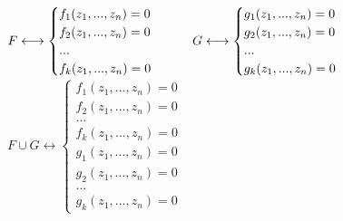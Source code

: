 \documentclass[geometry.tex]{subfiles}
\begin{document}
\begin{examples}
\begin{enumerate}
\begin{uutv}
\begin{enumerate}
              $F \longleftrightarrow \begin{cases}
              f_1(z_1,...,z_n) = 0\\
              f_2(z_1,...,z_n) = 0\\
              ...\\
              f_k(z_1,...,z_n) = 0
            \end{cases} \qquad
            G \longleftrightarrow \begin{cases}
              g_1(z_1,...,z_n) = 0\\
              g_2(z_1,...,z_n) = 0\\
              ...\\
              g_k(z_1,...,z_n) = 0
              \end{cases}$\\
              $F \cup G \longleftrightarrow \begin{cases}
              f_1(z_1,...,z_n) = 0\\
              f_2(z_1,...,z_n) = 0\\
              ...\\
              f_k(z_1,...,z_n) = 0\\
              g_1(z_1,...,z_n) = 0\\
              g_2(z_1,...,z_n) = 0\\
              ...\\
              g_k(z_1,...,z_n) = 0
              \end{cases}$\\


\end{enumerate}
\end{uutv}
\end{enumerate}
\end{examples}
\end{document}
